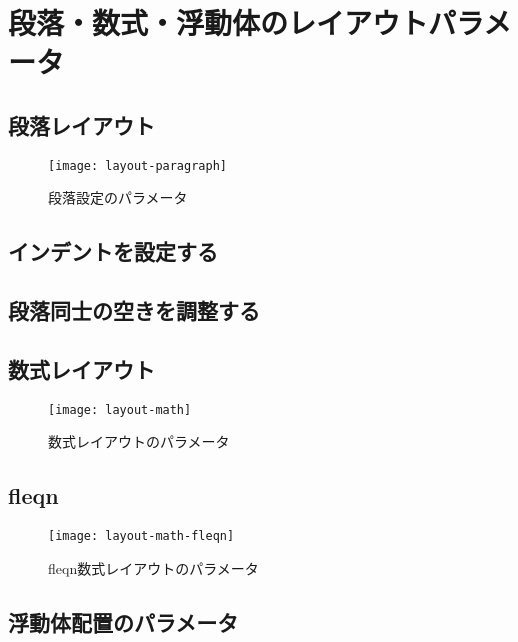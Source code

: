 \section{段落・数式・浮動体のレイアウトパラメータ}

\subsection{段落レイアウト}

\begin{figure}[htbp]
 \begin{center}
  \texttt{[image: layout-paragraph]}
  \caption{段落設定のパラメータ}
 \end{center}
\end{figure}

\subsection{インデントを設定する}

\subsection{段落同士の空きを調整する}



\subsection{数式レイアウト}

\begin{figure}[htbp]
 \begin{center}
  \texttt{[image: layout-math]}
  \caption{数式レイアウトのパラメータ}
 \end{center}
\end{figure}

\subsection{fleqn}

\begin{figure}[htbp]
 \begin{center}
  \texttt{[image: layout-math-fleqn]}
  \caption{fleqn数式レイアウトのパラメータ}
 \end{center}
\end{figure}

\subsection{浮動体配置のパラメータ}

